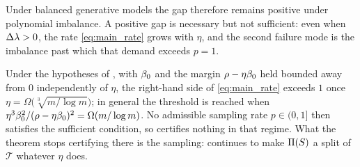 Under balanced generative models the gap therefore remains positive under polynomial
imbalance. A
positive gap is necessary but not sufficient: even when $\Delta\lambda>0$, the rate
\eqref{eq:main_rate} grows with $\eta$, and the second failure mode is the imbalance
past which that demand exceeds $p=1$.

\begin{corollary}\label{cor:infeasible}
Under the hypotheses of , with $\beta_0$ and the margin
$\rho-\eta\beta_0$ held bounded away from $0$ independently of $\eta$, the
right-hand side of \eqref{eq:main_rate} exceeds $1$ once
$\eta=\Omega\!\bigl(\sqrt[3]{m/\log m}\bigr)$; in general the threshold is
reached when $\eta^3\beta_0^2/(\rho-\eta\beta_0)^2=\Omega(m/\log m)$. No admissible sampling rate
$p\in(0,1]$ then satisfies the sufficient condition, so 
certifies nothing in that regime. What the theorem stops certifying there is the
sampling:  continues to make $\Pi(S)$ a split of
$\mathcal{T}$ whatever $\eta$ does.
\end{corollary}

